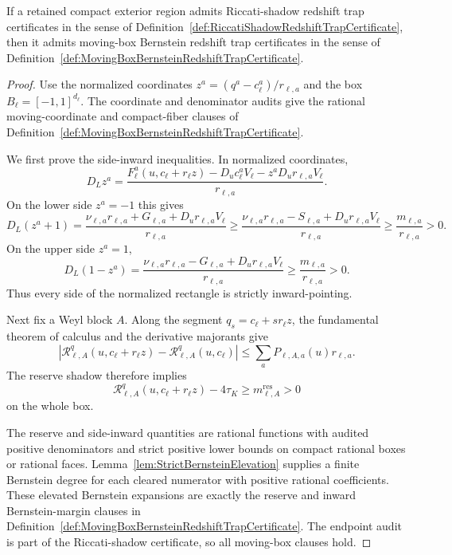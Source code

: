\begin{theorem}\label{thm:RiccatiShadowGivesMovingBox}
If a retained compact exterior region admits Riccati-shadow redshift trap
certificates in the sense of
Definition~\ref{def:RiccatiShadowRedshiftTrapCertificate}, then it admits
moving-box Bernstein redshift trap certificates in the sense of
Definition~\ref{def:MovingBoxBernsteinRedshiftTrapCertificate}.
\end{theorem}

\begin{proof}
Use the normalized coordinates
$z^a=(q^a-c_\ell^a)/r_{\ell,a}$ and the box $B_\ell=[-1,1]^{d_\ell}$.
The coordinate and denominator audits give the rational moving-coordinate and
compact-fiber clauses of
Definition~\ref{def:MovingBoxBernsteinRedshiftTrapCertificate}.

We first prove the side-inward inequalities.  In normalized coordinates,
\[
    D_Lz^a
    =
    \frac{
        F_\ell^a(u,c_\ell+r_\ell z)
        -D_uc_\ell^aV_\ell
        -z^aD_ur_{\ell,a}V_\ell
    }{r_{\ell,a}} .
\]
On the lower side $z^a=-1$ this gives
\[
    D_L(z^a+1)
    =
    \frac{
        \nu_{\ell,a}r_{\ell,a}
        +G_{\ell,a}
        +D_ur_{\ell,a}V_\ell
    }{r_{\ell,a}}
    \ge
    \frac{
        \nu_{\ell,a}r_{\ell,a}
        -S_{\ell,a}
        +D_ur_{\ell,a}V_\ell
    }{r_{\ell,a}}
    \ge
    \frac{m_{\ell,a}}{r_{\ell,a}}>0 .
\]
On the upper side $z^a=1$,
\[
    D_L(1-z^a)
    =
    \frac{
        \nu_{\ell,a}r_{\ell,a}
        -G_{\ell,a}
        +D_ur_{\ell,a}V_\ell
    }{r_{\ell,a}}
    \ge
    \frac{m_{\ell,a}}{r_{\ell,a}}>0 .
\]
Thus every side of the normalized rectangle is strictly inward-pointing.

Next fix a Weyl block $A$.  Along the segment
$q_s=c_\ell+s r_\ell z$, the fundamental theorem of calculus and the derivative
majorants give
\[
    \left|
    \mathcal R_{\ell,A}^q(u,c_\ell+r_\ell z)
    -\mathcal R_{\ell,A}^q(u,c_\ell)
    \right|
    \le
    \sum_a P_{\ell,A,a}(u)r_{\ell,a}.
\]
The reserve shadow therefore implies
\[
    \mathcal R_{\ell,A}^q(u,c_\ell+r_\ell z)-4\tau_K
    \ge
    m_{\ell,A}^{\mathrm{res}}>0
\]
on the whole box.

The reserve and side-inward quantities are rational functions with audited
positive denominators and strict positive lower bounds on compact rational
boxes or rational faces.  Lemma~\ref{lem:StrictBernsteinElevation} supplies a
finite Bernstein degree for each cleared numerator with positive rational
coefficients.  These elevated Bernstein expansions are exactly the reserve and
inward Bernstein-margin clauses in
Definition~\ref{def:MovingBoxBernsteinRedshiftTrapCertificate}.  The endpoint
audit is part of the Riccati-shadow certificate, so all moving-box clauses
hold.
\end{proof}

